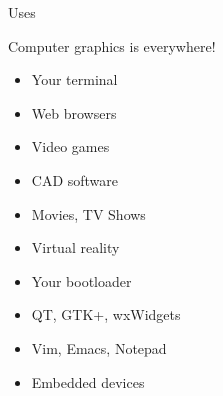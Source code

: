 \documentclass{lug}
\begin{document}
\begin{frame}{Uses}
    \noindent
    \begin{minipage}{.65\textwidth}
        Computer graphics is everywhere!
        \begin{itemize}
            \item Your terminal
            \item Web browsers
            \item Video games
            \item CAD software
            \item Movies, TV Shows
            \item Virtual reality
            \item Your bootloader
            \item QT, GTK+, wxWidgets
            \item Vim, Emacs, Notepad
            \item Embedded devices
        \end{itemize}
    \end{minipage}%
    \begin{minipage}{.35\textwidth}

\end{minipage}
\end{frame}
\end{document}
